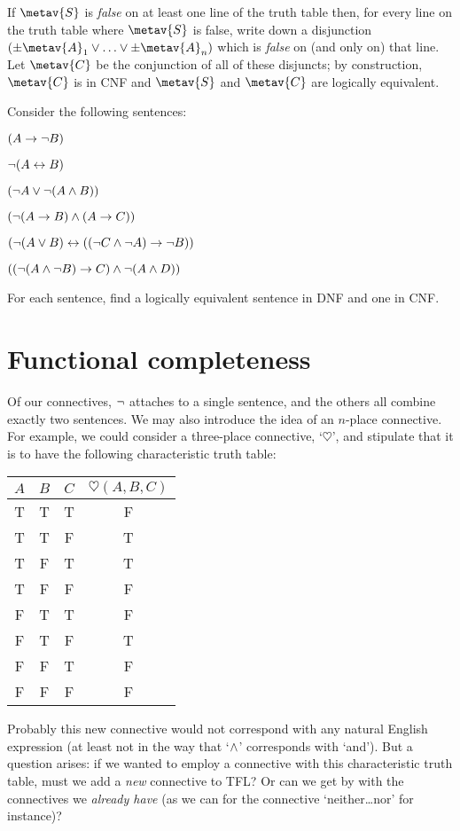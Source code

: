 	If $\metav{S}$ is \emph{false} on at least one line of the truth table then, for every line on the truth table where $\metav{S}$ is false, write down a disjunction $(\pm\metav{A}_1 \eor \ldots \eor \pm\metav{A}_n)$ which is \emph{false} on (and only on) that line. Let $\metav{C}$ be the conjunction of all of these disjuncts; by construction, $\metav{C}$ is in CNF and $\metav{S}$ and $\metav{C}$ are logically equivalent.

\practiceproblems
\problempart
\label{pr.DNF}
Consider the following sentences:
	\begin{earg}
		\item $(A \rightarrow \neg B)$
		\item $\neg (A \leftrightarrow B)$
		\item $(\neg A \vee \neg (A \wedge B))$
		\item $(\neg (A \rightarrow B ) \wedge (A \rightarrow C))$
		\item $(\neg (A \vee B) \leftrightarrow ((\neg C \wedge \neg A) \rightarrow \neg B))$
		\item $((\neg (A \wedge \neg B) \rightarrow C) \wedge \neg (A \wedge D))$
	\end{earg}
        For each sentence, find a logically equivalent sentence in DNF and one in CNF.
        
\chapter{Functional completeness}

Of our connectives, $\neg$ attaches to a single sentence, and the others all combine exactly two sentences. We may also introduce the idea of an $n$-place connective. For example, we could consider a three-place connective, `$\heartsuit$', and stipulate that it is to have the following characteristic truth table:
\begin{center}
\begin{tabular}{c c c | c}
$A$ & $B$ & $C$ & $\heartsuit(A,B,C)$\\
\hline
 T & T & T & F \\
 T & T & F & T \\
 T & F & T & T \\
 T & F & F & F \\
 F & T & T & F \\
 F & T & F & T \\
 F & F & T & F \\
 F & F & F & F
\end{tabular}
\end{center}
Probably this new connective would not correspond with any natural English expression (at least not in the way that `$\wedge$' corresponds with `and'). But a question arises: if we wanted to employ a connective with this characteristic truth table, must we add a \emph{new} connective to TFL? Or can we get by with the connectives we \emph{already have} (as we can for the connective `neither\dots nor' for instance)?

